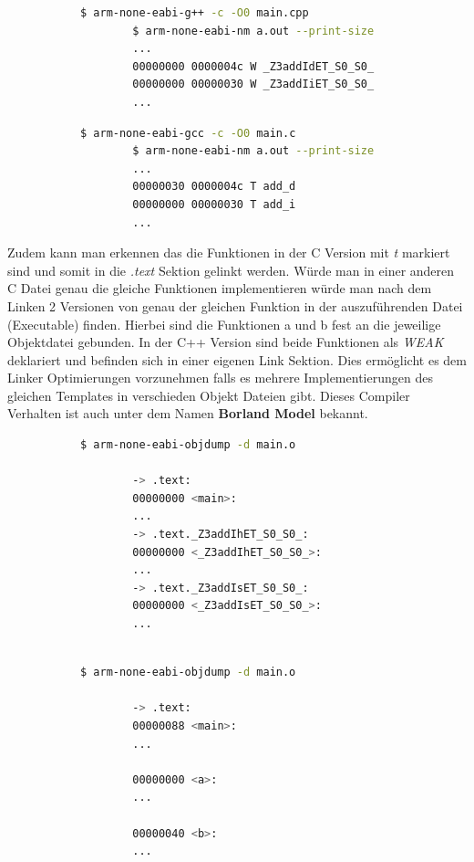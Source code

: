 \documentclass[MES,Master,ngerman]{twbook}%
\begin{document}
\begin{figure}[!htb]
	\begin{subfigure}[b]{0.5\textwidth}
		\begin{lstlisting}[gobble=6, title={Analyse C++}, language=bash, numbers=none]
		$ arm-none-eabi-g++ -c -O0 main.cpp
		$ arm-none-eabi-nm a.out --print-size
		...
		00000000 0000004c W _Z3addIdET_S0_S0_
		00000000 00000030 W _Z3addIiET_S0_S0_
		...
		\end{lstlisting}
	\end{subfigure}
	\begin{subfigure}[b]{0.5\textwidth}
		\begin{lstlisting}[gobble=6, title={Analyse C}, language=bash, numbers=none]
		$ arm-none-eabi-gcc -c -O0 main.c
		$ arm-none-eabi-nm a.out --print-size
		...
		00000030 0000004c T add_d
		00000000 00000030 T add_i
		...
		\end{lstlisting}
	\end{subfigure}
\end{figure}

Zudem kann man erkennen das die Funktionen in der C Version mit \textit{t} markiert sind und somit in die \textit{.text} Sektion gelinkt werden. Würde man in einer anderen C Datei genau die gleiche Funktionen implementieren würde man nach dem Linken 2 Versionen von genau der gleichen Funktion in der auszuführenden Datei (Executable) finden. Hierbei sind die Funktionen a und b fest an die jeweilige Objektdatei gebunden. In der C++ Version sind beide Funktionen als \textit{WEAK} deklariert und befinden sich in einer eigenen Link Sektion. Dies ermöglicht es dem Linker Optimierungen vorzunehmen falls es mehrere Implementierungen des gleichen Templates in verschieden Objekt Dateien gibt. Dieses Compiler Verhalten ist auch unter dem Namen \textbf{Borland Model} bekannt.

\begin{figure}[!htb]
	\begin{subfigure}[b]{0.5\textwidth}
		\begin{lstlisting}[gobble=6, title={Analyse C++}, language=bash, numbers=none]
		$ arm-none-eabi-objdump -d main.o

		-> .text:
		00000000 <main>:
		...
		-> .text._Z3addIhET_S0_S0_:
		00000000 <_Z3addIhET_S0_S0_>:
		...
		-> .text._Z3addIsET_S0_S0_:
		00000000 <_Z3addIsET_S0_S0_>:
		...
		
		\end{lstlisting}
	\end{subfigure}
	\begin{subfigure}[b]{0.5\textwidth}
		\begin{lstlisting}[gobble=6, title={Analyse C}, language=bash, numbers=none]
		$ arm-none-eabi-objdump -d main.o
		
		-> .text:
		00000088 <main>:
		...
		
		00000000 <a>:
		...
		
		00000040 <b>:
		...
		\end{lstlisting}
	\end{subfigure}
\end{figure}
\end{document}
